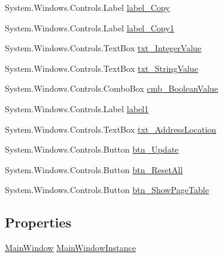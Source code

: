 \begin{DoxyCompactItemize}
\item 
System.\+Windows.\+Controls.\+Label \hyperlink{class_c_p_u___o_s___simulator_1_1_memory_window_a663f25aef0cd9c3755f100b3507b5f84}{label\+\_\+\+Copy}
\item 
System.\+Windows.\+Controls.\+Label \hyperlink{class_c_p_u___o_s___simulator_1_1_memory_window_a0f501c04b3319ae43e681335e50eeba4}{label\+\_\+\+Copy1}
\item 
System.\+Windows.\+Controls.\+Text\+Box \hyperlink{class_c_p_u___o_s___simulator_1_1_memory_window_af1ad9478de6dac0b4476c51b42849ecf}{txt\+\_\+\+Integer\+Value}
\item 
System.\+Windows.\+Controls.\+Text\+Box \hyperlink{class_c_p_u___o_s___simulator_1_1_memory_window_aca8e57432af036b698d0eeaaa765c483}{txt\+\_\+\+String\+Value}
\item 
System.\+Windows.\+Controls.\+Combo\+Box \hyperlink{class_c_p_u___o_s___simulator_1_1_memory_window_a2a1da5df6a425ce20c7b639fa66c58f2}{cmb\+\_\+\+Boolean\+Value}
\item 
System.\+Windows.\+Controls.\+Label \hyperlink{class_c_p_u___o_s___simulator_1_1_memory_window_ae35c7d3110d7cf96493d6fa68274e858}{label1}
\item 
System.\+Windows.\+Controls.\+Text\+Box \hyperlink{class_c_p_u___o_s___simulator_1_1_memory_window_a3f766ac6c531af3b14248819947d9023}{txt\+\_\+\+Address\+Location}
\item 
System.\+Windows.\+Controls.\+Button \hyperlink{class_c_p_u___o_s___simulator_1_1_memory_window_a9274df08bf008c43b325e50d6db6067f}{btn\+\_\+\+Update}
\item 
System.\+Windows.\+Controls.\+Button \hyperlink{class_c_p_u___o_s___simulator_1_1_memory_window_aeeefcad9b4510fd7fd5899f3a2db4786}{btn\+\_\+\+Reset\+All}
\item 
System.\+Windows.\+Controls.\+Button \hyperlink{class_c_p_u___o_s___simulator_1_1_memory_window_a62372edf818561f1584160d41c2f67f7}{btn\+\_\+\+Show\+Page\+Table}
\end{DoxyCompactItemize}
\subsection*{Properties}
\begin{DoxyCompactItemize}
\item 
\hyperlink{class_c_p_u___o_s___simulator_1_1_main_window}{Main\+Window} \hyperlink{class_c_p_u___o_s___simulator_1_1_memory_window_aaa625aed8c7670aed16f9ab0f9e5e080}{Main\+Window\+Instance}
\end{DoxyCompactItemize}

